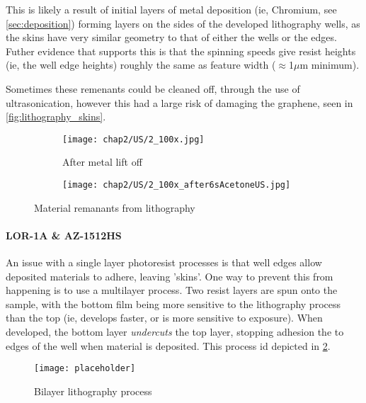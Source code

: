 \documentclass[../../Matt_Gebert_Honours_Thesis.tex]{subfiles}
\begin{document}
	This is likely a result of initial layers of metal deposition (ie, Chromium, see \cref{sec:deposition}) forming layers on the sides of the developed lithography wells, as the skins have very similar geometry to that of either the wells or the edges. Futher evidence that supports this is that the spinning speeds give resist heights (ie, the well edge heights) roughly the same as feature width ($\approx$1$\mu$m minimum).
	
	Sometimes these remenants could be cleaned off, through the use of ultrasonication, however this had a large risk of damaging the graphene, seen in \cref{fig:lithography_skins}.
	
	
	\begin{figure}[H]
		\centering
		\begin{subfigure}[b]{0.3\textwidth}
						\texttt{[image: chap2/US/2\_100x.jpg]}
			\caption{After metal lift off}			
		\end{subfigure}
		\begin{subfigure}[b]{0.3\textwidth}
						\texttt{[image: chap2/US/2\_100x\_after6sAcetoneUS.jpg]}
		\end{subfigure}
		\begin{subfigure}[b]{0.3\textwidth}
		\end{subfigure}
		\caption{Material remanants from lithography}\label{fig:lithography_skins_us}
	\end{figure}
	
	\paragraph{LOR-1A \& AZ-1512HS}
	An issue with a single layer photoresist processes is that well edges allow deposited materials to adhere, leaving 'skins'. One way to prevent this from happening is to use a multilayer process. Two resist layers are spun onto the sample, with the bottom film being more sensitive to the lithography process than the top (ie, develops faster, or is more sensitive to exposure). When developed, the bottom layer \textit{undercuts} the top layer, stopping adhesion the to edges of the well when material is deposited. This process id depicted in \cref{fig:bilayer_lithography}.
	
	\begin{figure}[H]
		\centering
				\texttt{[image: placeholder]}
		\caption{Bilayer lithography process}\label{fig:bilayer_lithography}
	\end{figure}
	
\end{document}
